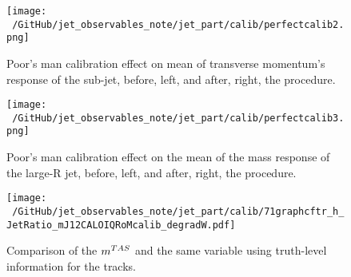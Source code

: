 \begin{figure}[!ht]
  \centering
      \texttt{[image: ~/GitHub/jet\_observables\_note/jet\_part/calib/perfectcalib2.png]}
  \caption{Poor's man calibration effect on mean of transverse momentum's response of the sub-jet, before, left, and after, right, the procedure.}
  \label{fig:calibA}
\end{figure}

\begin{figure}[!ht]
  \centering
      \texttt{[image: ~/GitHub/jet\_observables\_note/jet\_part/calib/perfectcalib3.png]}
  \caption{Poor's man calibration effect on the mean of the mass response of the large-R jet, before, left, and after, right, the procedure.}
  \label{fig:calibA2}
\end{figure}


\begin{figure}[!ht]
  \centering
      \texttt{[image: ~/GitHub/jet\_observables\_note/jet\_part/calib/71graphcftr\_h\_JetRatio\_mJ12CALOIQRoMcalib\_degradW.pdf]}
  \caption{Comparison of the $m^{TAS}$ and the same variable using truth-level information for the tracks.}
  \label{fig:breakdown1}
\end{figure}
